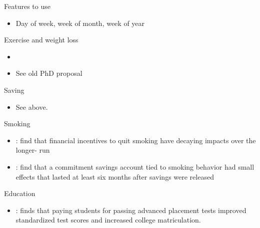 \documentclass[a4paper, 11pt]{report}
\begin{document}
Features to use
\begin{itemize}

    \item Day of week, week of month, week of year

\end{itemize}

Exercise and weight loss
\begin{itemize}
	\item \citet{john2011financial}
	\item See old PhD proposal
\end{itemize}

Saving
\begin{itemize}
	\item See above.
\end{itemize}

Smoking
\begin{itemize}
	\item \citet{volpp2009randomized}: find that financial incentives to quit smoking have decaying impacts over the longer- run
	\item \citet{gine2010put}: find that a commitment savings account tied to smoking behavior had small effects that lasted at least six months after savings were released
\end{itemize}

Education
\begin{itemize}
	\item \citet{jackson2010little}: finds that paying students for passing advanced placement tests improved standardized test scores and increased college matriculation.
\end{itemize}
\end{document}
